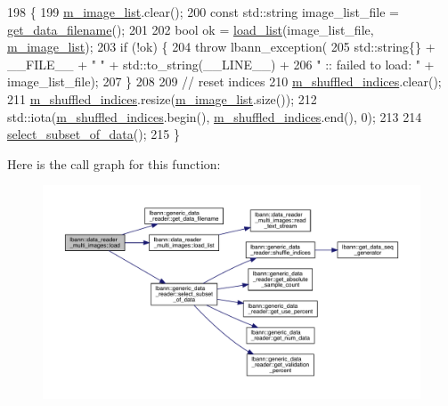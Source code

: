 \begin{DoxyCode}
198                                     \{
199   \hyperlink{classlbann_1_1data__reader__multi__images_a6d8e2d161c9efff1ac70f847b4a7e9d0}{m\_image\_list}.clear();
200   \textcolor{keyword}{const} std::string image\_list\_file = \hyperlink{classlbann_1_1generic__data__reader_a56664e1b43f3fe923cf6d652f14b40a9}{get\_data\_filename}();
201 
202   \textcolor{keywordtype}{bool} ok = \hyperlink{classlbann_1_1data__reader__multi__images_a31763c860d3e3cc57a6af0158b9977f7}{load\_list}(image\_list\_file, \hyperlink{classlbann_1_1data__reader__multi__images_a6d8e2d161c9efff1ac70f847b4a7e9d0}{m\_image\_list});
203   \textcolor{keywordflow}{if} (!ok) \{
204     \textcolor{keywordflow}{throw} lbann\_exception(
205       std::string\{\} + \_\_FILE\_\_ + \textcolor{stringliteral}{" "} + std::to\_string(\_\_LINE\_\_) +
206       \textcolor{stringliteral}{" :: failed to load: "} + image\_list\_file);
207   \}
208 
209   \textcolor{comment}{// reset indices}
210   \hyperlink{classlbann_1_1generic__data__reader_aaab6aeff67ffff1c689336851fec2c57}{m\_shuffled\_indices}.clear();
211   \hyperlink{classlbann_1_1generic__data__reader_aaab6aeff67ffff1c689336851fec2c57}{m\_shuffled\_indices}.resize(\hyperlink{classlbann_1_1data__reader__multi__images_a6d8e2d161c9efff1ac70f847b4a7e9d0}{m\_image\_list}.size());
212   std::iota(\hyperlink{classlbann_1_1generic__data__reader_aaab6aeff67ffff1c689336851fec2c57}{m\_shuffled\_indices}.begin(), \hyperlink{classlbann_1_1generic__data__reader_aaab6aeff67ffff1c689336851fec2c57}{m\_shuffled\_indices}.end(), 0);
213 
214   \hyperlink{classlbann_1_1generic__data__reader_aa28fdeeb6af492540f507e49adff5d6c}{select\_subset\_of\_data}();
215 \}
\end{DoxyCode}
Here is the call graph for this function\+:\nopagebreak
\begin{figure}[H]
\begin{center}
\leavevmode
\includegraphics[width=350pt]{classlbann_1_1data__reader__multi__images_afb8adef1f9ac6723d71ae5afc29b01ec_cgraph}
\end{center}
\end{figure}
